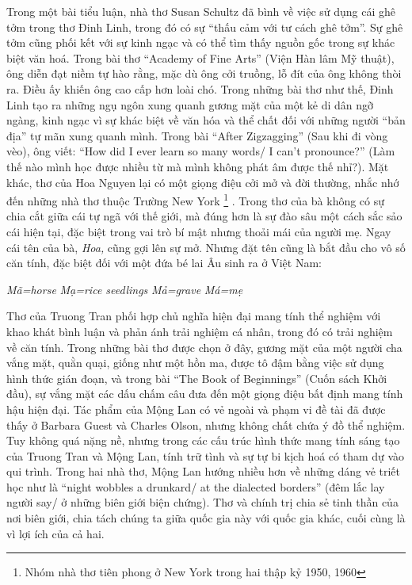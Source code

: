 \documentclass[../main.tex]{subfiles}
\begin{document}
\begin{multicols}{2}
Trong một bài tiểu luận, nhà thơ Susan Schultz đã bình về việc sử dụng cái ghê tởm trong thơ Đinh Linh, trong đó có sự “thấu cảm với tư cách ghê tởm”. Sự ghê tởm cũng phối kết với sự kinh ngạc và có thể tìm thấy nguồn gốc trong sự khác biệt văn hoá. Trong bài thơ “Academy of Fine Arts” (Viện Hàn lâm Mỹ thuật), ông diễn đạt niềm tự hào rằng, mặc dù ông cởi truồng, lỗ đít của ông không thòi ra. Điều ấy khiến ông cao cấp hơn loài chó. Trong những bài thơ như thế, Đinh Linh tạo ra những ngụ ngôn xung quanh gương mặt của một kẻ di dân ngỡ ngàng, kinh ngạc vì sự khác biệt về văn hóa và thể chất đối với những người “bản địa” tự mãn xung quanh mình. Trong bài “After Zigzagging” (Sau khi đi vòng vèo), ông viết: “How did I ever learn so many words/ I can’t pronounce?” (Làm thế nào mình học được nhiều từ mà mình không phát âm được thế nhỉ?). Mặt khác, thơ của Hoa Nguyen lại có một giọng điệu cởi mở và đời thường, nhắc nhớ đến những nhà thơ thuộc Trường New York \footnote{
Nhóm nhà thơ tiên phong ở New York trong hai thập kỷ 1950, 1960} . Trong thơ của bà không có sự chia cắt giữa cái tự ngã với thế giới, mà đúng hơn là sự đào sâu một cách sắc sảo cái hiện tại, đặc biệt trong vai trò bí mật nhưng thoải mái của người mẹ. Ngay cái tên của bà, \textit{Hoa, }cũng gợi lên sự mở. Nhưng đặt tên cũng là bắt đầu cho vô số căn tính, đặc biệt đối với một đứa bé lai Âu sinh ra ở Việt Nam: 
\begin{blockquote}
        
\textit{Mã=horse}        
\textit{Mạ=rice seedlings}        
\textit{Mả=grave} 
\textit{Má=mẹ} 

\end{blockquote}
 
Thơ của Truong Tran phối hợp chủ nghĩa hiện đại mang tính thể nghiệm với khao khát bình luận và phản ánh trải nghiệm cá nhân, trong đó có trải nghiệm về căn tính. Trong những bài thơ được chọn ở đây, gương mặt của một người cha vắng mặt, quằn quại, giống như một hồn ma, được tô đậm bằng việc sử dụng hình thức gián đoạn, và trong bài “The Book of Beginnings” (Cuốn sách Khởi đầu), sự vắng mặt các dấu chấm câu đưa đến một giọng điệu bất định mang tính hậu hiện đại. Tác phẩm của Mộng Lan có vẻ ngoài và phạm vi đề tài đã được thấy ở Barbara Guest và Charles Olson, nhưng không chất chứa ý đồ thể nghiệm. Tuy không quá nặng nề, nhưng trong các cấu trúc hình thức mang tính sáng tạo của Truong Tran và Mộng Lan, tính trữ tình và sự tự bi kịch hoá có tham dự vào qui trình. Trong hai nhà thơ, Mộng Lan hướng nhiều hơn về những dáng vẻ triết học như là “night wobbles a drunkard/ at the dialected borders” (đêm lắc lay người say/ ở những biên giới biện chứng). Thơ và chính trị chia sẻ tinh thần của nơi biên giới, chia tách chúng ta giữa quốc gia này với quốc gia khác, cuối cùng là vì lợi ích của cả hai. 
 

\end{multicols}
\end{document}
